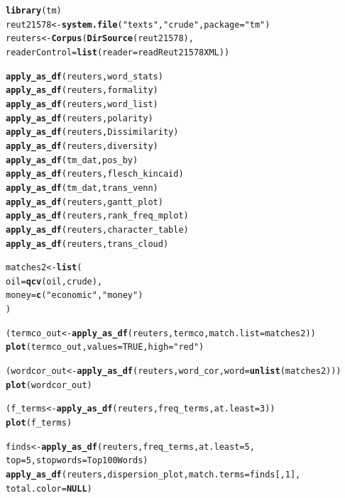\documentclass{article}\usepackage[]{graphicx}\usepackage[]{color}
\makeatletter
\newcommand{\hlnum}[1]{\textcolor[rgb]{0.686,0.059,0.569}{#1}}%
\newcommand{\hlstr}[1]{\textcolor[rgb]{0.192,0.494,0.8}{#1}}%
\newcommand{\hlstd}[1]{\textcolor[rgb]{0.345,0.345,0.345}{#1}}%
\newcommand{\hlkwa}[1]{\textcolor[rgb]{0.161,0.373,0.58}{\textbf{#1}}}%
\newcommand{\hlkwb}[1]{\textcolor[rgb]{0.69,0.353,0.396}{#1}}%
\newcommand{\hlkwc}[1]{\textcolor[rgb]{0.333,0.667,0.333}{#1}}%
\newcommand{\hlkwd}[1]{\textcolor[rgb]{0.737,0.353,0.396}{\textbf{#1}}}%
\newenvironment{kframe}{%
 \def\at@end@of@kframe{}%
 \ifinner\ifhmode%
  \def\at@end@of@kframe{\end{minipage}}%
  \begin{minipage}{\columnwidth}%
 \fi\fi%
 \def\FrameCommand##1{\hskip\@totalleftmargin \hskip-\fboxsep
 \colorbox{shadecolor}{##1}\hskip-\fboxsep
     \hskip-\linewidth \hskip-\@totalleftmargin \hskip\columnwidth}%
 \MakeFramed {\advance\hsize-\width
   \@totalleftmargin\z@ \linewidth\hsize
   \@setminipage}}%
 {\par\unskip\endMakeFramed%
 \at@end@of@kframe}
\newenvironment{knitrout}{}{} %
\makeatother
\begin{document}
\begin{knitrout}
\color{fgcolor}\begin{kframe}
\begin{alltt}
\hlkwd{library}\hlstd{(tm)}
\hlstd{reut21578} \hlkwb{<-} \hlkwd{system.file}\hlstd{(}\hlstr{"texts"}\hlstd{,} \hlstr{"crude"}\hlstd{,} \hlkwc{package} \hlstd{=} \hlstr{"tm"}\hlstd{)}
\hlstd{reuters} \hlkwb{<-} \hlkwd{Corpus}\hlstd{(}\hlkwd{DirSource}\hlstd{(reut21578),}
    \hlkwc{readerControl} \hlstd{=} \hlkwd{list}\hlstd{(}\hlkwc{reader} \hlstd{= readReut21578XML))}

\hlkwd{apply_as_df}\hlstd{(reuters, word_stats)}
\hlkwd{apply_as_df}\hlstd{(reuters, formality)}
\hlkwd{apply_as_df}\hlstd{(reuters, word_list)}
\hlkwd{apply_as_df}\hlstd{(reuters, polarity)}
\hlkwd{apply_as_df}\hlstd{(reuters, Dissimilarity)}
\hlkwd{apply_as_df}\hlstd{(reuters, diversity)}
\hlkwd{apply_as_df}\hlstd{(tm_dat, pos_by)}
\hlkwd{apply_as_df}\hlstd{(reuters, flesch_kincaid)}
\hlkwd{apply_as_df}\hlstd{(tm_dat, trans_venn)}
\hlkwd{apply_as_df}\hlstd{(reuters, gantt_plot)}
\hlkwd{apply_as_df}\hlstd{(reuters, rank_freq_mplot)}
\hlkwd{apply_as_df}\hlstd{(reuters, character_table)}
\hlkwd{apply_as_df}\hlstd{(reuters, trans_cloud)}

\hlstd{matches2} \hlkwb{<-} \hlkwd{list}\hlstd{(}
    \hlkwc{oil} \hlstd{=} \hlkwd{qcv}\hlstd{(oil, crude),}
    \hlkwc{money} \hlstd{=} \hlkwd{c}\hlstd{(}\hlstr{"economic"}\hlstd{,} \hlstr{"money"}\hlstd{)}
\hlstd{)}

\hlstd{(termco_out} \hlkwb{<-} \hlkwd{apply_as_df}\hlstd{(reuters, termco,} \hlkwc{match.list} \hlstd{= matches2))}
\hlkwd{plot}\hlstd{(termco_out,} \hlkwc{values} \hlstd{=} \hlnum{TRUE}\hlstd{,} \hlkwc{high}\hlstd{=}\hlstr{"red"}\hlstd{)}

\hlstd{(wordcor_out} \hlkwb{<-} \hlkwd{apply_as_df}\hlstd{(reuters, word_cor,} \hlkwc{word} \hlstd{=} \hlkwd{unlist}\hlstd{(matches2)))}
\hlkwd{plot}\hlstd{(wordcor_out)}

\hlstd{(f_terms} \hlkwb{<-} \hlkwd{apply_as_df}\hlstd{(reuters, freq_terms,} \hlkwc{at.least} \hlstd{=} \hlnum{3}\hlstd{))}
\hlkwd{plot}\hlstd{(f_terms)}

\hlstd{finds} \hlkwb{<-} \hlkwd{apply_as_df}\hlstd{(reuters, freq_terms,} \hlkwc{at.least} \hlstd{=} \hlnum{5}\hlstd{,}
    \hlkwc{top} \hlstd{=} \hlnum{5}\hlstd{,} \hlkwc{stopwords} \hlstd{= Top100Words)}
\hlkwd{apply_as_df}\hlstd{(reuters, dispersion_plot,} \hlkwc{match.terms} \hlstd{= finds[,} \hlnum{1}\hlstd{],}
    \hlkwc{total.color} \hlstd{=} \hlkwa{NULL}\hlstd{)}
\end{alltt}
\end{kframe}
\end{knitrout}
\end{document}
